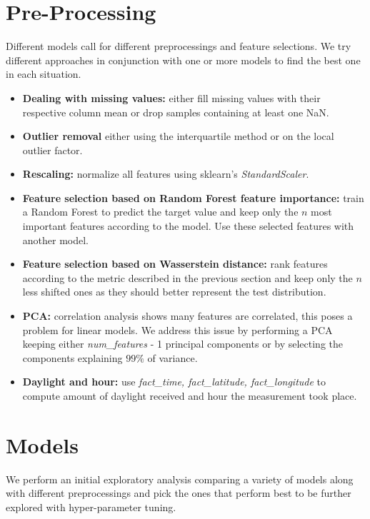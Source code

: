 \documentclass[letterpaper, 10 pt, conference]{ieeeconf}
\begin{document}
    \section{Pre-Processing}
    Different models call for different preprocessings and feature selections. We try different approaches in conjunction with one or more models to find the best one in each situation.
    \begin{itemize}
        \item \textbf{Dealing with missing values:} either fill missing values with their respective column mean or drop samples containing at least one NaN.
        \item \textbf{Outlier removal} either using the interquartile method or on the local outlier factor.
        \item \textbf{Rescaling:} normalize all features using sklearn's \textit{StandardScaler}.
        \item \textbf{Feature selection based on Random Forest feature importance:} train a Random Forest to predict the target value and  keep only the $n$ most important features according to the model. Use these selected features with another model.
        \item \textbf{Feature selection based on Wasserstein distance:} rank features according to the metric described in the previous section and keep only the $n$ less shifted ones as they should better represent the test distribution.
        \item \textbf{PCA:} correlation analysis shows many features are correlated, this poses a problem for linear models. We address this issue by performing a PCA keeping either \textit{num\_features} - 1 principal components or by selecting the components explaining $99\%$ of variance.
        \item \textbf{Daylight and hour:} use \textit{fact\_time, fact\_latitude, fact\_longitude} to compute amount of daylight received and hour the measurement took place.
    \end{itemize} 
    
    \section{Models}
    We perform an initial exploratory analysis comparing a variety of models along with different preprocessings and pick the ones that perform best to be further explored with hyper-parameter tuning. 
    
\end{document}
